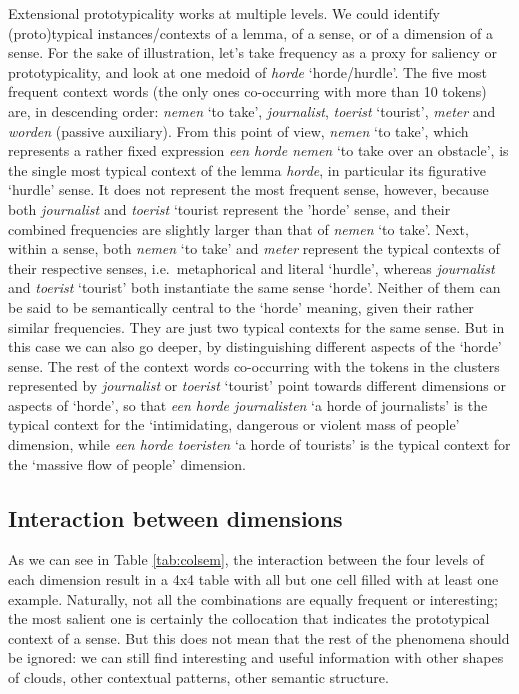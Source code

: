 \documentclass[
]{book}
\begin{document}
Extensional prototypicality works at multiple levels. We could identify (proto)typical instances/contexts of a lemma, of a sense, or of a dimension of a sense.
For the sake of illustration, let's take frequency as a proxy for saliency or prototypicality, and look at one medoid of \emph{horde} `horde/hurdle'. The five most frequent context words (the only ones co-occurring with more than 10 tokens) are, in descending order: \emph{nemen} `to take', \emph{journalist}, \emph{toerist} `tourist', \emph{meter} and \emph{worden} (passive auxiliary). From this point of view, \emph{nemen} `to take', which represents a rather fixed expression \emph{een horde nemen} `to take over an obstacle', is the single most typical context of the lemma \emph{horde}, in particular its figurative `hurdle' sense. It does not represent the most frequent sense, however, because both \emph{journalist} and \emph{toerist} `tourist represent the 'horde' sense, and their combined frequencies are slightly larger than that of \emph{nemen} `to take'. Next, within a sense, both \emph{nemen} `to take' and \emph{meter} represent the typical contexts of their respective senses, i.e.~metaphorical and literal `hurdle', whereas \emph{journalist} and \emph{toerist} `tourist' both instantiate the same sense `horde'. Neither of them can be said to be semantically central to the `horde' meaning, given their rather similar frequencies. They are just two typical contexts for the same sense. But in this case we can also go deeper, by distinguishing different aspects of the `horde' sense. The rest of the context words co-occurring with the tokens in the clusters represented by \emph{journalist} or \emph{toerist} `tourist' point towards different dimensions or aspects of `horde', so that \emph{een horde journalisten} `a horde of journalists' is the typical context for the `intimidating, dangerous or violent mass of people' dimension, while \emph{een horde toeristen} `a horde of tourists' is the typical context for the `massive flow of people' dimension.

\hypertarget{interaction-between-dimensions}{%
\subsection{Interaction between dimensions}\label{interaction-between-dimensions}}

As we can see in Table \ref{tab:colsem}, the interaction between the four levels of each dimension result in a 4x4 table with all but one cell filled with at least one example. Naturally, not all the combinations are equally frequent or interesting; the most salient one is certainly the collocation that indicates the prototypical context of a sense. But this does not mean that the rest of the phenomena should be ignored: we can still find interesting and useful information with other shapes of clouds, other contextual patterns, other semantic structure.
\end{document}
